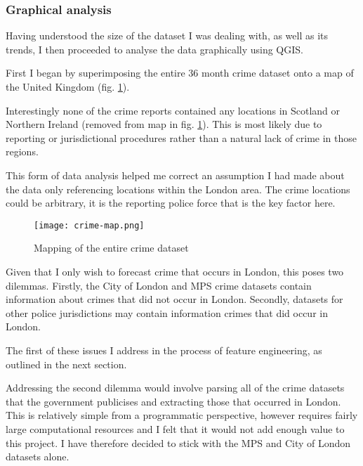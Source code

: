 \documentclass{article}
\begin{document}
	\subsubsection{Graphical analysis}

	Having understood the size of the dataset I was dealing with, as well as its trends, I then proceeded to analyse the data graphically using QGIS.

	First I began by superimposing the entire 36 month crime dataset onto a map of the United Kingdom (fig. \ref{fig:map-whole}).

	Interestingly none of the crime reports contained any locations in Scotland or Northern Ireland (removed from map in fig. \ref{fig:map-whole}). This is most likely due to reporting or jurisdictional procedures rather than a natural lack of crime in those regions.

	This form of data analysis helped me correct an assumption I had made about the data only referencing locations within the London area. The crime locations could be arbitrary, it is the reporting police force that is the key factor here.

	\begin{figure}[H]
		\centering
		\texttt{[image: crime-map.png]}

		\scriptsize
		\hfill

		\caption{Mapping of the entire crime dataset}
		\label{fig:map-whole}
	\end{figure}

	Given that I only wish to forecast crime that occurs in London, this poses two dilemmas. Firstly, the City of London and MPS crime datasets contain information about crimes that did not occur in London. Secondly, datasets for other police jurisdictions may contain information crimes that did occur in London.

	The first of these issues I address in the process of feature engineering, as outlined in the next section.

	Addressing the second dilemma would involve parsing all of the crime datasets that the government publicises and extracting those that occurred in London. This is relatively simple from a programmatic perspective, however requires fairly large computational resources and I felt that it would not add enough value to this project. I have therefore decided to stick with the MPS and City of London datasets alone.
\end{document}
